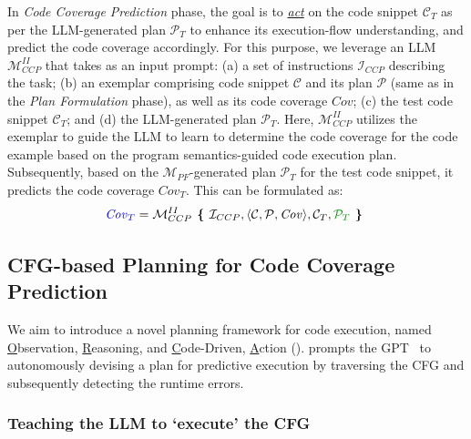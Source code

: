In \textit{Code Coverage Prediction} phase, the goal is to \underline{\textit{act}} on the code snippet $\mathcal{C}_T$ as per the LLM-generated plan $\mathcal{P}_T$ to enhance its execution-flow understanding, and predict the code coverage accordingly. For this purpose, we leverage an LLM $\mathcal{M}_{CCP}^{II}$ that takes as an input prompt: (a) a set of instructions $\mathcal{I}_{CCP}$ describing the task; (b) an exemplar comprising code snippet $\mathcal{C}$ and its plan $\mathcal{P}$ (same as in the \textit{Plan Formulation} phase), as well as its code coverage $\mathit{Cov}$; (c) the test code snippet $\mathcal{C}_T$; and (d) the LLM-generated plan $\mathcal{P}_T$.
Here, $\mathcal{M}_{CCP}^{II}$ utilizes the exemplar to guide the LLM to learn to determine the code coverage for the code example based on the program semantics-guided code execution plan. Subsequently, based on the $\mathcal{M}_{PF}$-generated plan $\mathcal{P}_T$ for the test code snippet, it predicts the code coverage $\mathit{Cov}_T$. 
This can be formulated as:
\begin{equation}
\textcolor{blue}{\mathit{Cov}_{T}} = \mathcal{M}_{CCP}^{II} \textbf{\ \{\ } \mathcal{I}_{CCP}, \langle \mathcal{C}, \mathcal{P}, \mathit{Cov} \rangle, \mathcal{C}_T, \textcolor{dkgreen}{\mathcal{P}_T} \textbf{\ \}\ }  
\end{equation}

\subsection{CFG-based Planning for Code Coverage Prediction}


We aim to introduce a novel planning framework for code
execution, named \underline{O}bservation, \underline{R}easoning, and
\underline{C}ode-Driven, \underline{A}ction ({\orca}). {\orca} prompts
the GPT~\cite{chatGPT} to autonomously devising a plan for
predictive execution by traversing the CFG and
subsequently detecting the runtime errors.

\subsubsection{Teaching the LLM to `execute' the CFG}

